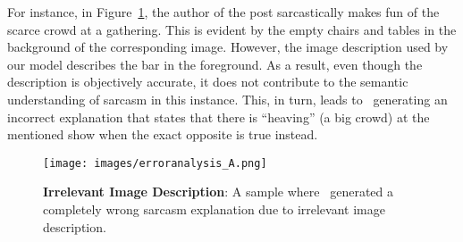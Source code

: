 For instance, in Figure~\ref{fig:error-analysis-irrelevant-desc}, the author of the post sarcastically makes fun of the scarce crowd at a gathering. This is evident by the empty chairs and tables in the background of the corresponding image. However, the image description used by our model describes the bar in the foreground. As a result, even though the description is objectively accurate, it does not contribute to the semantic understanding of sarcasm in this instance. This, in turn, leads to \model\ generating an incorrect explanation that states that there is ``heaving'' (a big crowd) at the mentioned show when the exact opposite is true instead.  

\begin{figure}[!h]
\centering
  \texttt{[image: images/erroranalysis\_A.png]}
  \caption{\textbf{Irrelevant Image Description}: A sample where \model\ generated a completely wrong sarcasm explanation due to irrelevant image description. %
}
\label{fig:error-analysis-irrelevant-desc}
\end{figure}